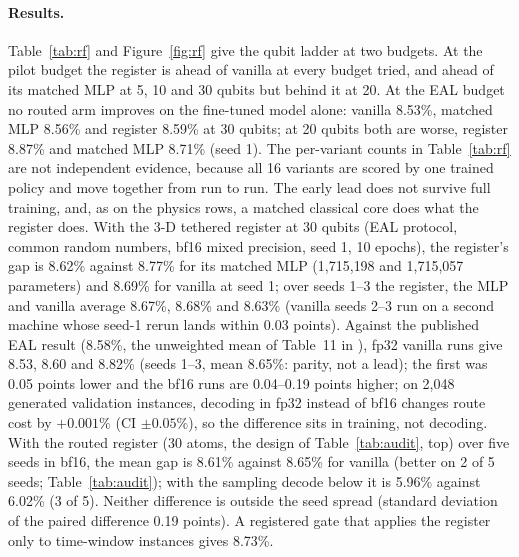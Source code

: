 \documentclass{article}
\begin{document}
\paragraph{Results.} Table~\ref{tab:rf} and Figure~\ref{fig:rf} give the qubit ladder at two budgets. At the pilot
budget the register is ahead of vanilla at every budget tried, and ahead of its matched MLP at 5, 10 and 30 qubits but
behind it at 20. At the
EAL budget no routed arm improves on the fine-tuned model alone: vanilla 8.53\%, matched MLP 8.56\% and register
8.59\% at 30 qubits; at 20 qubits both are worse, register 8.87\% and matched MLP 8.71\% (seed 1). The per-variant counts in Table~\ref{tab:rf} are not
independent evidence, because all 16 variants are scored by one trained policy and move together from run to run. The
early lead does not survive full training, and, as on the physics rows, a matched classical core does what the
register does. With the 3-D tethered register at 30 qubits (EAL protocol, common random numbers, bf16 mixed precision, seed 1, 10 epochs), the
register's gap is 8.62\% against 8.77\% for its matched MLP (1{,}715{,}198 and 1{,}715{,}057 parameters) and 8.69\% for
vanilla at seed 1; over seeds 1--3 the register, the MLP and vanilla average 8.67\%, 8.68\% and 8.63\% (vanilla seeds 2--3 run on a second machine whose seed-1 rerun lands within 0.03 points).
Against the published EAL result (8.58\%, the unweighted mean of Table~11 in \citet{berto2025routefinder}), fp32
vanilla runs give 8.53, 8.60 and 8.82\% (seeds 1--3, mean 8.65\%: parity, not a lead); the first was 0.05 points lower and the bf16 runs are 0.04--0.19 points higher; on 2{,}048 generated validation
instances, decoding in fp32 instead of bf16 changes route cost by $+0.001\%$ (CI $\pm0.05\%$), so the difference sits
in training, not decoding.
With the routed register (30 atoms, the design of Table~\ref{tab:audit}, top) over five seeds in bf16, the mean gap is
8.61\% against 8.65\% for vanilla (better on 2 of 5 seeds; Table~\ref{tab:audit}); with the sampling decode below it is
5.96\% against 6.02\% (3 of 5). Neither difference is outside the seed spread (standard deviation of the paired
difference 0.19 points). A registered gate that applies the register only to time-window instances gives 8.73\%.
\end{document}
